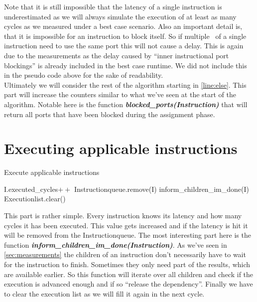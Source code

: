 Note that it is still impossible that the latency of a single instruction is underestimated as we will always simulate the execution of at least as many cycles as we measured under a best case scenario. Also an important detail is, that it is impossible for an instruction to block itself. So if multiple \microops\ of a single instruction need to use the same port this will not cause a delay. This is again due to the measurements as the delay caused by ``inner instructional port blockings'' is already included in the best case runtime. We did not include this in the pseudo code above for the sake of readability.\\

Ultimately we will consider the rest of the algorithm starting in \autoref{line:else}. This part will increase the counters similar to what we've seen at the start of the algorithm. Notable here is the function \textbf{\emph{blocked\_ports(Instruction)}} that will return all ports that have been blocked during the assignment phase.



\section{Executing applicable instructions}
\label{sec:execute}

\begin{algorithm}[H]
    \SetAlgoLined
    \caption{Execute applicable instructions}
    \label{alg:execute}
     {
        I.executed\_cycles$++$\;
         {
            Instructionqueue.remove(I)\;
        }
        inform\_children\_im\_done(I)\;
    }
    Executionlist.clear()\;
\end{algorithm}

This part is rather simple. Every instruction knows its latency and how many cycles it has been executed. This value gets increased and if the latency is hit it will be removed from the Instructionqueue. The most interesting part here is the function \textbf{\emph{inform\_children\_im\_done(Instruction)}}. As we've seen in \autoref{sec:measurements} the children of an instruction don't necessarily have to wait for the instruction to finish. Sometimes they only need part of the results, which are available earlier. So this function will iterate over all children and check if the execution is advanced enough and if so ``release the dependency''. Finally we have to clear the execution list as we will fill it again in the next cycle.

